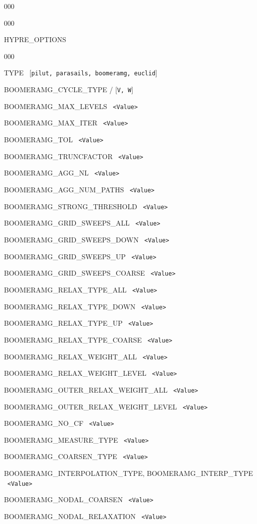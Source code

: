 \documentclass[12pt]{article}
\begin{document}
\begin{deflist}{000}
\begin{deflist}{000}
\item[HYPRE\_OPTIONS]
\begin{deflist}{000}
\item[TYPE] \ [{\tt pilut, parasails, boomeramg, euclid}]
\item[BOOMERAMG\_CYCLE\_TYPE] / [{\tt V, W}]
\item[BOOMERAMG\_MAX\_LEVELS] \ {\tt <Value>}
\item[BOOMERAMG\_MAX\_ITER] \ {\tt <Value>}
\item[BOOMERAMG\_TOL] \ {\tt <Value>}
\item[BOOMERAMG\_TRUNCFACTOR] \ {\tt <Value>}
\item[BOOMERAMG\_AGG\_NL] \ {\tt <Value>}
\item[BOOMERAMG\_AGG\_NUM\_PATHS] \ {\tt <Value>}
\item[BOOMERAMG\_STRONG\_THRESHOLD] \ {\tt <Value>}
\item[BOOMERAMG\_GRID\_SWEEPS\_ALL] \ {\tt <Value>}
\item[BOOMERAMG\_GRID\_SWEEPS\_DOWN] \ {\tt <Value>}
\item[BOOMERAMG\_GRID\_SWEEPS\_UP] \ {\tt <Value>}
\item[BOOMERAMG\_GRID\_SWEEPS\_COARSE] \ {\tt <Value>}
\item[BOOMERAMG\_RELAX\_TYPE\_ALL] \ {\tt <Value>}
\item[BOOMERAMG\_RELAX\_TYPE\_DOWN] \ {\tt <Value>}
\item[BOOMERAMG\_RELAX\_TYPE\_UP] \ {\tt <Value>}
\item[BOOMERAMG\_RELAX\_TYPE\_COARSE] \ {\tt <Value>}
\item[BOOMERAMG\_RELAX\_WEIGHT\_ALL] \ {\tt <Value>}
\item[BOOMERAMG\_RELAX\_WEIGHT\_LEVEL] \ {\tt <Value>}
\item[BOOMERAMG\_OUTER\_RELAX\_WEIGHT\_ALL] \ {\tt <Value>}
\item[BOOMERAMG\_OUTER\_RELAX\_WEIGHT\_LEVEL] \ {\tt <Value>}
\item[BOOMERAMG\_NO\_CF] \ {\tt <Value>}
\item[BOOMERAMG\_MEASURE\_TYPE] \ {\tt <Value>}
\item[BOOMERAMG\_COARSEN\_TYPE] \ {\tt <Value>}
\item[BOOMERAMG\_INTERPOLATION\_TYPE, BOOMERAMG\_INTERP\_TYPE] \ {\tt <Value>}
\item[BOOMERAMG\_NODAL\_COARSEN] \ {\tt <Value>}
\item[BOOMERAMG\_NODAL\_RELAXATION] \ {\tt <Value>}
\end{deflist}


\end{deflist}
\end{deflist}
\end{document}
